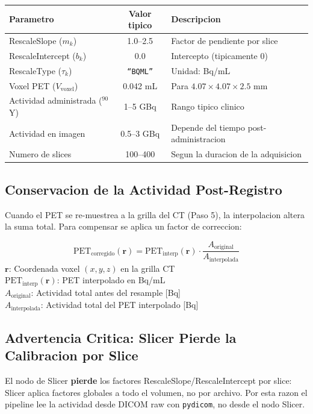 \documentclass[12pt,a4paper]{article}
\newcommand{\vardef}[2]{\noindent\textbf{#1}: #2\\}
\begin{document}
\begin{table}[H]
\centering
\begin{tabular}{l c l}
\toprule
\textbf{Parametro} & \textbf{Valor tipico} & \textbf{Descripcion} \\
\midrule
RescaleSlope ($m_k$) & 1.0--2.5 & Factor de pendiente por slice \\
RescaleIntercept ($b_k$) & 0.0 & Intercepto (tipicamente 0) \\
RescaleType ($\tau_k$) & \texttt{``BQML''} & Unidad: Bq/mL \\
Voxel PET ($V_{\text{voxel}}$) & 0.042 mL & Para $4.07 \times 4.07 \times 2.5$ mm \\
Actividad administrada ($^{90}$Y) & 1--5 GBq & Rango tipico clinico \\
Actividad en imagen & 0.5--3 GBq & Depende del tiempo post-administracion \\
Numero de slices & 100--400 & Segun la duracion de la adquisicion \\
\bottomrule
\end{tabular}
\end{table}

\subsection{Conservacion de la Actividad Post-Registro}

Cuando el PET se re-muestrea a la grilla del CT (Paso 5), la interpolacion altera la suma total.
Para compensar se aplica un factor de correccion:

\begin{equation}\label{eq:conservacion}
    \text{PET}_{\text{corregido}}(\mathbf{r}) =
    \text{PET}_{\text{interp}}(\mathbf{r}) \cdot
    \frac{A_{\text{original}}}{A_{\text{interpolada}}}
\end{equation}
\vardef{$\mathbf{r}$}{Coordenada voxel $(x,y,z)$ en la grilla CT}
\vardef{$\text{PET}_{\text{interp}}(\mathbf{r})$}{PET interpolado en Bq/mL}
\vardef{$A_{\text{original}}$}{Actividad total antes del resample [Bq]}
\vardef{$A_{\text{interpolada}}$}{Actividad total del PET interpolado [Bq]}

\subsection{Advertencia Critica: Slicer Pierde la Calibracion por Slice}

El nodo de Slicer \textbf{pierde} los factores RescaleSlope/RescaleIntercept por slice: Slicer
aplica factores globales a todo el volumen, no por archivo. Por esta razon el pipeline lee la
actividad desde DICOM raw con \texttt{pydicom}, no desde el nodo Slicer.
\end{document}
